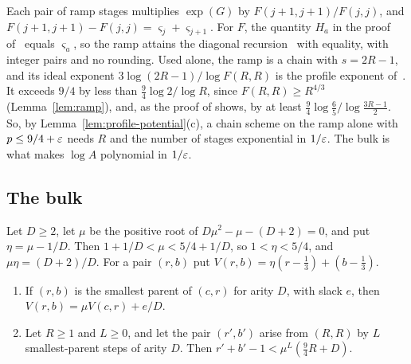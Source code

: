 Each pair of ramp stages multiplies \(\exp(G)\) by
\(F(j+1,j+1)/F(j,j)\), and \(F(j+1,j+1)-F(j,j)=\varsigma_j+\varsigma_{j+1}\).
For \(F\), the quantity \(H_a\) in the proof
of~\citep[Lemma~5.1]{OAI26} equals \(\varsigma_a\), so the ramp attains the
diagonal recursion~\citep[(5.1)]{OAI26} with equality, with integer
pairs and no rounding. Used alone, the ramp is a chain with \(s=2R-1\),
and its ideal exponent \(3\log(2R-1)/\log F(R,R)\) is the profile
exponent of~\citep[Section~3]{FinCon26}. It exceeds \(9/4\) by less
than \(\frac94\log2/\log R\), since \(F(R,R)\ge R^{4/3}\)
(Lemma~\ref{lem:ramp}), and, as the proof of
\citep[Proposition~11.1(b)]{FinCon26} shows, by at least
\(\frac94\log\frac65/\log\frac{3R-1}2\). So, by
Lemma~\ref{lem:profile-potential}(c), a chain scheme on the ramp alone
with \(p\le9/4+\varepsilon\) needs \(R\) and the number of stages exponential
in \(1/\varepsilon\). The bulk is what makes \(\log A\) polynomial in
\(1/\varepsilon\).

\subsection{The bulk}
\label{subsec:chains-bulk}

\begin{lemma}\label{lem:bulk-potential}
Let \(D\ge2\), let \(\mu\) be the positive root of
\(D\mu^2-\mu-(D+2)=0\), and put \(\eta=\mu-1/D\). Then
\(1+1/D<\mu<5/4+1/D\), so \(1<\eta<5/4\), and \(\mu\eta=(D+2)/D\). For a
pair \((r,b)\) put \(V(r,b)=\eta(r-\frac13)+(b-\frac13)\).
\begin{enumerate}
\item[(a)] If \((r,b)\) is the smallest parent of \((c,r)\) for arity
\(D\), with slack \(e\), then \(V(r,b)=\mu V(c,r)+e/D\).
\item[(b)] Let \(R\ge1\) and \(L\ge0\), and let the pair \((r',b')\)
arise from \((R,R)\) by \(L\) smallest-parent steps of arity \(D\). Then
\(r'+b'-1<\mu^L(\frac94R+D)\).
\end{enumerate}
\end{lemma}

